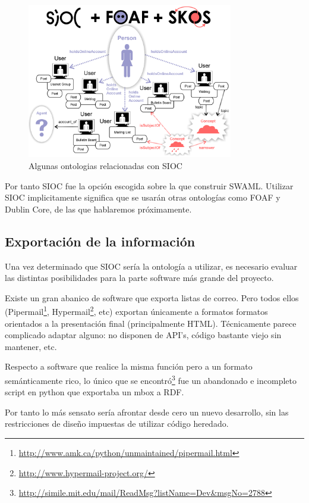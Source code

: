 \begin{figure}[H]
	\centering
	\includegraphics[width=9cm]{images/sioc-foaf-skos.png}
	\caption{Algunas ontologias relacionadas con SIOC}
	\label{fig:sioc+foaf+skos}
\end{figure}

Por tanto SIOC fue la opción escogida sobre la que construir SWAML. Utilizar SIOC
implicitamente significa que se usarán otras ontologías como FOAF y Dublin Core,
de las que hablaremos próximamente.


\subsection{Exportación de la información}

Una vez determinado que SIOC sería la ontología a utilizar, es necesario evaluar
las distintas posibilidades para la parte software más grande del proyecto.

Existe un gran abanico de software que exporta listas de correo. Pero todos
ellos (Pipermail\footnote{\url{http://www.amk.ca/python/unmaintained/pipermail.html}},
Hypermail\footnote{\url{http://www.hypermail-project.org/}}, etc) exportan únicamente
a formatos formatos orientados a la presentación final (principalmente HTML). 
Técnicamente parece complicado adaptar alguno: no disponen de API's, código bastante
viejo sin mantener, etc.

Respecto a software que realice la misma función pero a un formato semánticamente 
rico, lo único que se encontró\footnote{\url{http://simile.mit.edu/mail/ReadMsg?listName=Dev&msgNo=2788}} 
fue un abandonado e incompleto script en python que exportaba un mbox a RDF.

Por tanto lo más sensato sería afrontar desde cero un nuevo desarrollo, sin las 
restricciones de diseño impuestas de utilizar código heredado.


